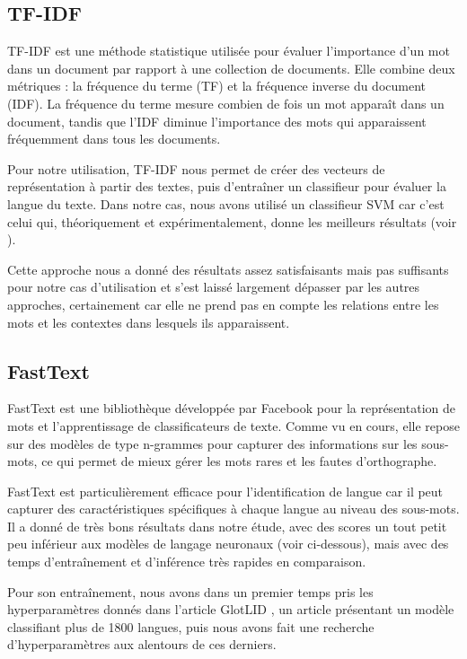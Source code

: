 \subsection{TF-IDF}

TF-IDF est une méthode statistique utilisée pour évaluer l'importance d'un mot dans un document par rapport à une collection de documents. Elle combine deux métriques : la fréquence du terme (TF) et la fréquence inverse du document (IDF). La fréquence du terme mesure combien de fois un mot apparaît dans un document, tandis que l'IDF diminue l'importance des mots qui apparaissent fréquemment dans tous les documents.

Pour notre utilisation, TF-IDF nous permet de créer des vecteurs de représentation à partir des textes, puis d'entraîner un classifieur pour évaluer la langue du texte. Dans notre cas, nous avons utilisé un classifieur SVM car c'est celui qui, théoriquement et expérimentalement, donne les meilleurs résultats (voir \cite{baldwin2010language}).

Cette approche nous a donné des résultats assez satisfaisants mais pas suffisants pour notre cas d'utilisation et s'est laissé largement dépasser par les autres approches, certainement car elle ne prend pas en compte les relations entre les mots et les contextes dans lesquels ils apparaissent.

\subsection{FastText}

FastText est une bibliothèque développée par Facebook \cite{joulin2017bag} pour la représentation de mots et l'apprentissage de classificateurs de texte. Comme vu en cours, elle repose sur des modèles de type n-grammes pour capturer des informations sur les sous-mots, ce qui permet de mieux gérer les mots rares et les fautes d'orthographe.

FastText est particulièrement efficace pour l'identification de langue car il peut capturer des caractéristiques spécifiques à chaque langue au niveau des sous-mots. Il a donné de très bons résultats dans notre étude, avec des scores un tout petit peu inférieur aux modèles de langage neuronaux (voir ci-dessous), mais avec des temps d'entraînement et d'inférence très rapides en comparaison.

Pour son entraînement, nous avons dans un premier temps pris les hyperparamètres donnés dans l'article GlotLID \cite{Kargaran_2023}, un article présentant un modèle classifiant plus de 1800 langues, puis nous avons fait une recherche d'hyperparamètres aux alentours de ces derniers. 

